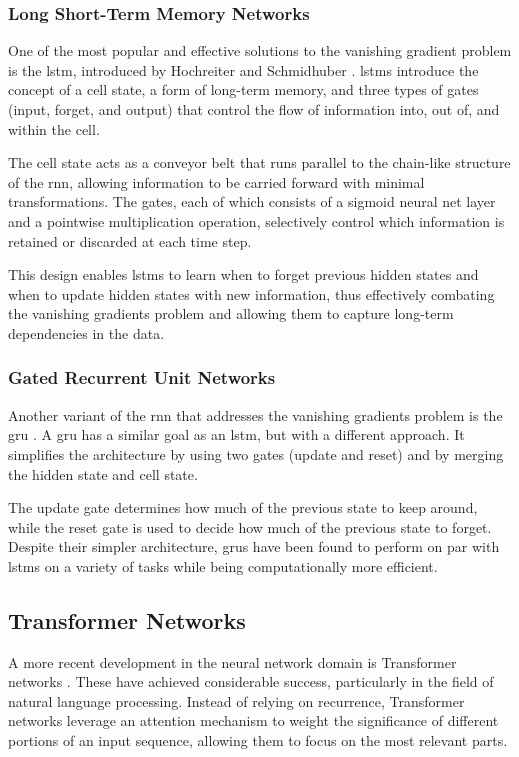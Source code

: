 \subsubsection{Long Short-Term Memory Networks}

One of the most popular and effective solutions to the vanishing gradient
problem is the \gls{lstm}, introduced by Hochreiter and Schmidhuber
\cite{lstm:1997}. \gls{lstm}s introduce the concept of a cell state, a form of
long-term memory, and three types of gates (input, forget, and output) that
control the flow of information into, out of, and within the cell.

The cell state acts as a conveyor belt that runs parallel to the chain-like
structure of the \gls{rnn}, allowing information to be carried forward with
minimal transformations. The gates, each of which consists of a sigmoid neural
net layer and a pointwise multiplication operation, selectively control which
information is retained or discarded at each time step.

This design enables \gls{lstm}s to learn when to forget previous hidden states
and when to update hidden states with new information, thus effectively
combating the vanishing gradients problem and allowing them to capture
long-term dependencies in the data.

\subsubsection{Gated Recurrent Unit Networks}

Another variant of the \gls{rnn} that addresses the vanishing gradients problem
is the \gls{gru} \cite{gru:2014}. A \gls{gru} has a similar goal as an
\gls{lstm}, but with a different approach. It simplifies the architecture by
using two gates (update and reset) and by merging the hidden state and cell
state.

The update gate determines how much of the previous state to keep around, while
the reset gate is used to decide how much of the previous state to forget.
Despite their simpler architecture, \gls{gru}s have been found to perform on
par with \gls{lstm}s on a variety of tasks while being computationally more
efficient.

\subsection{Transformer Networks}

A more recent development in the neural network domain is Transformer networks
\cite{attention:2017}. These have achieved considerable success, particularly
in the field of natural language processing. Instead of relying on recurrence,
Transformer networks leverage an attention mechanism to weight the significance
of different portions of an input sequence, allowing them to focus on the most
relevant parts.

